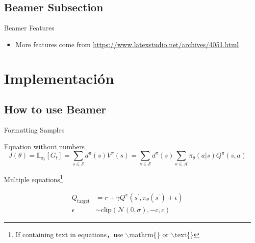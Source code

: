 \documentclass{beamer}
\begin{document}
\subsection{Beamer Subsection}

\begin{frame}{Beamer Features}
    \begin{itemize}
        \item More features come from  \url{https://www.latexstudio.net/archives/4051.html}
    \end{itemize}
\end{frame}

\section{Implementación}

\subsection{}



\subsection{How to use Beamer}

\begin{frame}{Formatting Samples}
    \begin{exampleblock}{Equation without numbers} 
        \begin{equation*}
            J(\theta) = \mathbb{E}_{\pi_\theta}[G_t] = \sum_{s\in\mathcal{S}} d^\pi (s)V^\pi(s)=\sum_{s\in\mathcal{S}} d^\pi(s)\sum_{a\in\mathcal{A}}\pi_\theta(a|s)Q^\pi(s,a)
        \end{equation*}
    \end{exampleblock}
    \begin{exampleblock}{Multiple equations\footnote{If containing text in equations，use $\backslash$mathrm\{\} or $\backslash$text\{\}}}
       
        \begin{align}
            Q_\mathrm{target}&=r+\gamma Q^\pi(s^\prime, \pi_\theta(s^\prime)+\epsilon)\\
            \epsilon&\sim\mathrm{clip}(\mathcal{N}(0, \sigma), -c, c)\nonumber
        \end{align}
    \end{exampleblock}
\end{frame}
\end{document}
